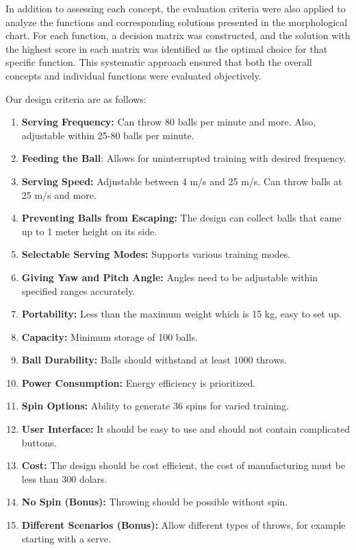 \documentclass[12pt]{article}
\begin{document}
In addition to assessing each concept, the evaluation criteria were also applied to analyze the functions and corresponding solutions presented in the morphological chart. For each function, a decision matrix was constructed, and the solution with the highest score in each matrix was identified as the optimal choice for that specific function. This systematic approach ensured that both the overall concepts and individual functions were evaluated objectively.


Our design criteria are as follows:


\begin{enumerate}
    \item \textbf{Serving Frequency:} Can throw 80 balls per minute and more. Also, adjustable within 25-80 balls per minute.
    \item \textbf{Feeding the Ball}: Allows for uninterrupted training with desired frequency.
    \item \textbf{Serving Speed:} Adjustable between 4 m/s and 25 m/s. Can throw balls at 25 m/s and more.
    \item \textbf{Preventing Balls from Escaping:} The design can collect balls that came up to 1 meter height on its side.
    \item \textbf{Selectable Serving Modes:} Supports various training modes.
    \item \textbf{Giving Yaw and Pitch Angle:} Angles need to be adjustable within specified ranges accurately.
    \item \textbf{Portability:} Less than the maximum weight which is 15 kg, easy to set up.
    \item \textbf{Capacity:} Minimum storage of 100 balls.
    \item \textbf{Ball Durability:} Balls should withstand at least 1000 throws.
    \item \textbf{Power Consumption:} Energy efficiency is prioritized.
    \item \textbf{Spin Options:} Ability to generate 36 spins for varied training.
    \item \textbf{User Interface:} It should be easy to use and should not contain complicated buttons.
    \item \textbf{Cost:} The design should be cost efficient, the cost of manufacturing must be less than 300 dolars.
    \item \textbf{No Spin (Bonus):} Throwing should be possible without spin.
    \item \textbf{Different Scenarios (Bonus):} Allow different types of throws, for example starting with a serve.
\end{enumerate}
\end{document}
